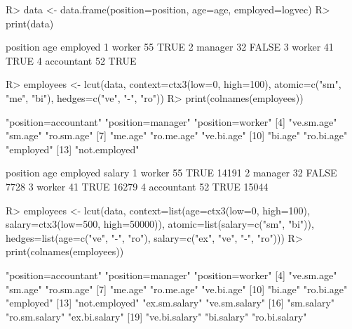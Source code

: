\documentclass{article}\usepackage[]{graphicx}\usepackage[]{color}
\begin{document}
\begin{Schunk}
% --begin: "lcut.data.frame"
\begin{Sinput}
R> data <- data.frame(position=position,
                      age=age,
                      employed=logvec)
R> print(data)
\end{Sinput}
\begin{Soutput}
    position age employed
1     worker  55     TRUE
2    manager  32    FALSE
3     worker  41     TRUE
4 accountant  52     TRUE
\end{Soutput}
\begin{Sinput}
R> employees <- lcut(data,
        context=ctx3(low=0, high=100),
        atomic=c("sm", "me", "bi"),
        hedges=c("ve", "-", "ro"))
R> print(colnames(employees))
\end{Sinput}
\begin{Soutput}
 [1] "position=accountant" "position=manager"    "position=worker"    
 [4] "ve.sm.age"           "sm.age"              "ro.sm.age"          
 [7] "me.age"              "ro.me.age"           "ve.bi.age"          
[10] "bi.age"              "ro.bi.age"           "employed"           
[13] "not.employed"       
\end{Soutput}
%
% --end: "lcut.data.frame"
\end{Schunk}

\begin{Schunk}
% --begin: "lcut.data.frame2"
\begin{Soutput}
    position age employed salary
1     worker  55     TRUE  14191
2    manager  32    FALSE   7728
3     worker  41     TRUE  16279
4 accountant  52     TRUE  15044
\end{Soutput}
\begin{Sinput}
R> employees <- lcut(data,
                     context=list(age=ctx3(low=0, high=100),
                                  salary=ctx3(low=500, high=50000)),
                     atomic=list(salary=c("sm", "bi")),
                     hedges=list(age=c("ve", "-", "ro"),
                                 salary=c("ex", "ve", "-", "ro")))
R> print(colnames(employees))
\end{Sinput}
\begin{Soutput}
 [1] "position=accountant" "position=manager"    "position=worker"    
 [4] "ve.sm.age"           "sm.age"              "ro.sm.age"          
 [7] "me.age"              "ro.me.age"           "ve.bi.age"          
[10] "bi.age"              "ro.bi.age"           "employed"           
[13] "not.employed"        "ex.sm.salary"        "ve.sm.salary"       
[16] "sm.salary"           "ro.sm.salary"        "ex.bi.salary"       
[19] "ve.bi.salary"        "bi.salary"           "ro.bi.salary"       
\end{Soutput}
%
% --end: "lcut.data.frame2"
\end{Schunk}
\end{document}
